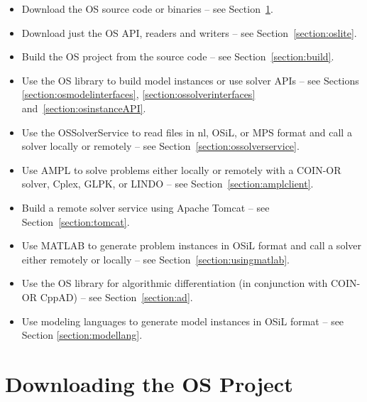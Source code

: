 \documentclass[11pt]{article}
\renewcommand{\_}{{\char"5F}}
\renewcommand{\{}{{\char"7B}}
\renewcommand{\}}{{\char"7D}}
\renewcommand{\^}{{\char"0D}}
\renewcommand{\'}{{\char"0D}}
\newif\ifknitro \knitrofalse    %
\begin{document}
\begin{itemize}
\item Download the OS source code or binaries -- see Section~\ref{section:download}.

\item Download just the OS API, readers and writers -- see Section~\ref{section:oslite}.

\item Build the OS project from the source code -- see Section~\ref{section:build}.

\item Use the OS library to build model instances or use solver APIs -- see Sections \ref{section:osmodelinterfaces},
\ref{section:ossolverinterfaces} and~\ref{section:osinstanceAPI}.

\item Use the OSSolverService to read files in nl, OSiL, 
or MPS format and call a solver locally or remotely -- see Section~\ref{section:ossolverservice}.


\item Use AMPL to solve problems either locally or remotely with a COIN-OR solver, Cplex, 
GLPK, \ifknitro Knitro\index{knitro}, \fi
or LINDO -- see Section~\ref{section:amplclient}.


\item Build a remote solver service using Apache Tomcat -- see Section~\ref{section:tomcat}.

\item Use MATLAB to generate problem instances in OSiL format and call a solver either remotely or locally
 -- see Section~\ref{section:usingmatlab}.

\item Use the OS library for algorithmic differentiation (in conjunction with 
COIN-OR CppAD) -- see Section~\ref{section:ad}.

\item Use modeling languages to generate model instances in OSiL format -- see Section \ref{section:modellang}.
\end{itemize}


\section{Downloading the OS Project}\label{section:download}
\end{document}
